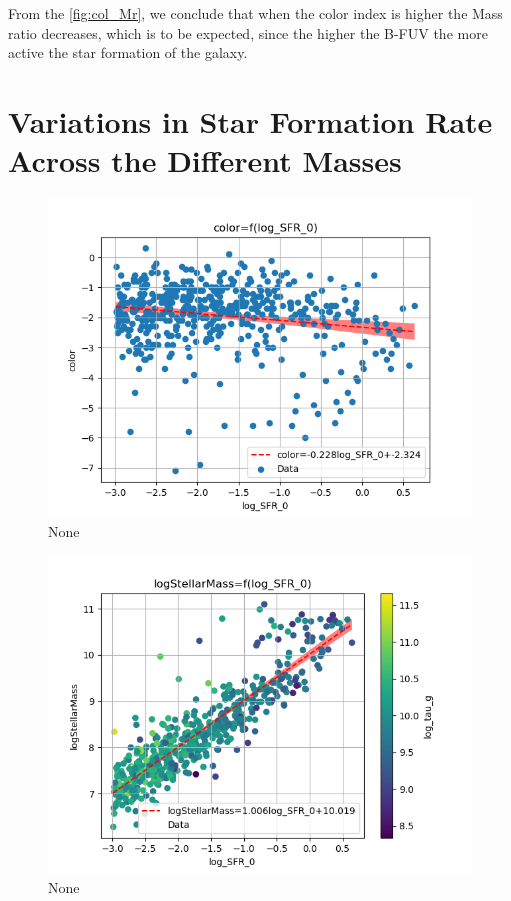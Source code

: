 \documentclass[a4paper,twocolumn]{article}
\begin{document}
From the \ref{fig:col_Mr}, we conclude that when the color index is higher the Mass ratio decreases, which is to be expected, since the higher the B-FUV the more active the star formation of the galaxy.



\section{Variations in Star Formation Rate Across the Different Masses}
\label{sec:orga487cc5}


\begin{figure}[!htpb]
\centering
\includegraphics[width=.9\linewidth]{./figs/log_SFR_0-color.png}
\caption{\label{fig:None}None}
\end{figure}

\begin{figure}[!htpb]
\centering
\includegraphics[width=.9\linewidth]{./figs/log_SFR_0-logStellarMass-color_log_tau_g.png}
\caption{\label{fig:None}None}
\end{figure}
\end{document}

